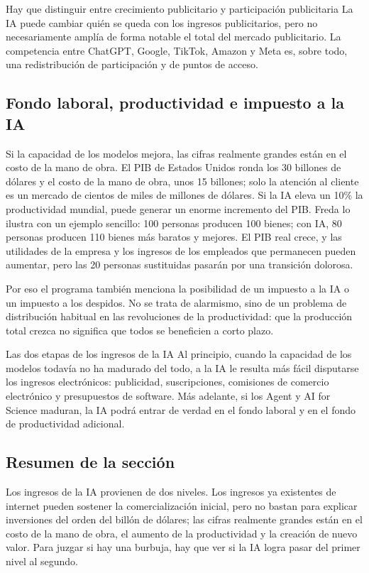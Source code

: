 \begin{warningbox}{Hay que distinguir entre crecimiento publicitario y participación publicitaria}
La IA puede cambiar quién se queda con los ingresos publicitarios, pero no necesariamente amplía de forma notable el total del mercado publicitario. La competencia entre ChatGPT, Google, TikTok, Amazon y Meta es, sobre todo, una redistribución de participación y de puntos de acceso.
\end{warningbox}

\subsection{Fondo laboral, productividad e impuesto a la IA}

Si la capacidad de los modelos mejora, las cifras realmente grandes están en el costo de la mano de obra. El PIB de Estados Unidos ronda los 30 billones de dólares y el costo de la mano de obra, unos 15 billones; solo la atención al cliente es un mercado de cientos de miles de millones de dólares. Si la IA eleva un 10\% la productividad mundial, puede generar un enorme incremento del PIB. Freda lo ilustra con un ejemplo sencillo: 100 personas producen 100 bienes; con IA, 80 personas producen 110 bienes más baratos y mejores. El PIB real crece, y las utilidades de la empresa y los ingresos de los empleados que permanecen pueden aumentar, pero las 20 personas sustituidas pasarán por una transición dolorosa.

Por eso el programa también menciona la posibilidad de un impuesto a la IA o un impuesto a los despidos. No se trata de alarmismo, sino de un problema de distribución habitual en las revoluciones de la productividad: que la producción total crezca no significa que todos se beneficien a corto plazo.

\begin{importantbox}{Las dos etapas de los ingresos de la IA}
Al principio, cuando la capacidad de los modelos todavía no ha madurado del todo, a la IA le resulta más fácil disputarse los ingresos electrónicos: publicidad, suscripciones, comisiones de comercio electrónico y presupuestos de software. Más adelante, si los Agent y AI for Science maduran, la IA podrá entrar de verdad en el fondo laboral y en el fondo de productividad adicional.
\end{importantbox}

\subsection{Resumen de la sección}

Los ingresos de la IA provienen de dos niveles. Los ingresos ya existentes de internet pueden sostener la comercialización inicial, pero no bastan para explicar inversiones del orden del billón de dólares; las cifras realmente grandes están en el costo de la mano de obra, el aumento de la productividad y la creación de nuevo valor. Para juzgar si hay una burbuja, hay que ver si la IA logra pasar del primer nivel al segundo.
